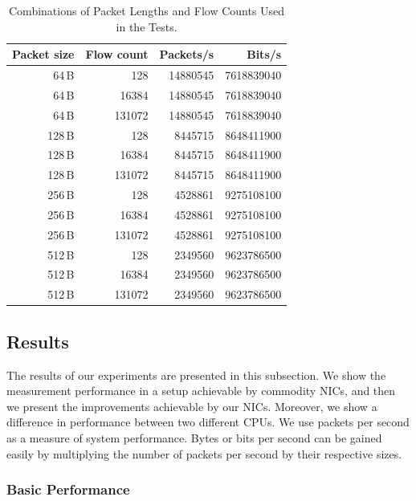 \renewcommand{\arraystretch}{1.1}
\begin{table}[!t]
        \centering
        \begin{tabular}{rrrr}
        \toprule
        \textbf{Packet size} & \textbf{Flow count} & \textbf{Packets/s} & \textbf{Bits/s}\\ \midrule
        64\,B & 128 & 14880545 & 7618839040 \\
        64\,B & 16384 & 14880545 & 7618839040 \\
        64\,B & 131072 & 14880545 & 7618839040 \\ \midrule
        128\,B & 128 & 8445715 & 8648411900 \\
        128\,B & 16384 & 8445715 & 8648411900 \\
        128\,B & 131072 & 8445715 & 8648411900 \\ \midrule
        256\,B & 128 & 4528861 & 9275108100 \\
        256\,B & 16384 & 4528861 & 9275108100 \\
        256\,B & 131072 & 4528861 & 9275108100 \\ \midrule
        512\,B & 128 & 2349560 & 9623786500 \\
        512\,B & 16384 & 2349560 & 9623786500 \\
        512\,B & 131072 & 2349560 & 9623786500 \\
        \bottomrule
        \end{tabular}
        \caption{Combinations of Packet Lengths and Flow Counts Used in the Tests.}
        \label{tab:test-data}
\end{table}


\subsection{Results} \label{subsec:high-density-results}

The results of our experiments are presented in this subsection. We show the measurement performance in a setup achievable by commodity NICs, and then we present the improvements achievable by our NICs. Moreover, we show a difference in performance between two different CPUs. We use packets per second as a measure of system performance. Bytes or bits per second can be gained easily by multiplying the number of packets per second by their respective sizes.

\subsubsection{Basic Performance}

